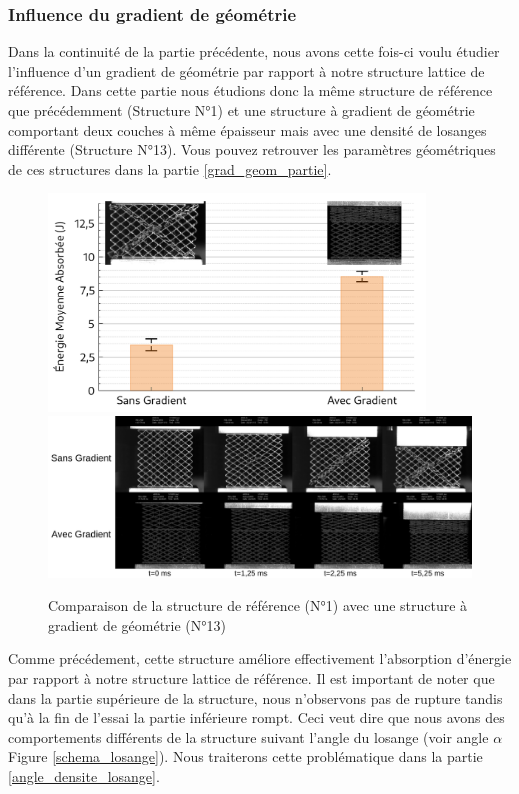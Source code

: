 \documentclass[a4paper]{article}
\begin{document}
	\subsubsection{Influence du gradient de géométrie}
	\label{grad_geom}
	\hspace{0.5cm}Dans la continuité de la partie précédente, nous avons cette fois-ci voulu étudier l'influence d'un gradient de géométrie par rapport à notre structure lattice de référence. Dans cette partie nous étudions donc la même structure de référence que précédemment (Structure N°1) et une structure à gradient de géométrie comportant deux couches à même épaisseur mais avec une densité de losanges différente (Structure N°13). Vous pouvez retrouver les paramètres géométriques de ces structures dans la partie \ref{grad_geom_partie}.
	
	\begin{figure}[H]
		\centering
		\includegraphics[width=10cm]{Images/7/7_4/7_4_2/comp_gradgeom.pdf}
		\includegraphics[width=16cm]{Images/7/7_4/7_4_2/instants.pdf}
		\caption{Comparaison de la structure de référence (N°1) avec une structure à gradient de géométrie (N°13)}
	\end{figure}

	Comme précédement, cette structure améliore effectivement l'absorption d'énergie par rapport à notre structure lattice de référence. Il est important de noter que dans la partie supérieure de la structure, nous n'observons pas de rupture tandis qu'à la fin de l'essai la partie inférieure rompt. Ceci veut dire que nous avons des comportements différents de la structure suivant l'angle du losange (voir angle $\alpha$ Figure \ref{schema_losange}). Nous traiterons cette problématique dans la partie \ref{angle_densite_losange}.\\
	
\end{document}
